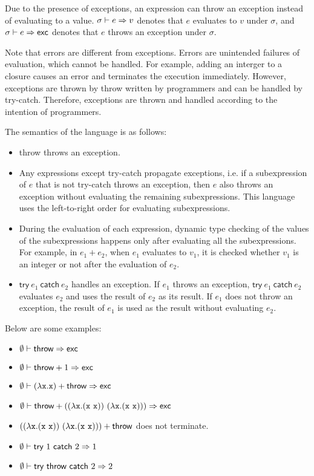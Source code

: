 \begin{enumerate}
Due to the presence of exceptions, an expression can throw an exception
instead of evaluating to a value. $\sigma\vdash e\Rightarrow v$ denotes that $e$
evaluates to $v$ under $\sigma$, and $\sigma\vdash e\Rightarrow\textsf{exc}$ denotes that $e$
throws an exception under $\sigma$.

Note that errors are
different from exceptions. Errors are unintended failures of evaluation, which
cannot be handled. For example, adding an interger to a closure causes an error
and terminates the execution immediately.
However, exceptions are thrown by \textsf{throw} written by programmers and
can be handled by \textsf{try-catch}. Therefore, exceptions are thrown and handled
according to the intention of programmers.

The semantics of the language is as follows:

\begin{itemize}
  \item \textsf{throw} throws an exception.
  \item Any expressions except \textsf{try-catch} propagate exceptions, i.e. if a
    subexpression of $e$ that is not \textsf{try-catch} throws an exception, then
    $e$ also throws an exception without evaluating the remaining subexpressions.
    This language uses the left-to-right order for evaluating subexpressions.
  \item During the evaluation of each expression,
    dynamic type checking of the values of the subexpressions happens only after
    evaluating all the subexpressions. For example, in $e_1+e_2$, when $e_1$
    evaluates to $v_1$, it is checked whether $v_1$ is an integer or not after
    the evaluation of $e_2$.
  \item $\textsf{try}\ e_1\ \textsf{catch}\ e_2$ handles an exception. If $e_1$ throws
    an exception, $\textsf{try}\ e_1\ \textsf{catch}\ e_2$ evaluates $e_2$ and uses the
    result of $e_2$ as its result. If $e_1$ does not throw an exception, the
    result of $e_1$ is used as the result without evaluating $e_2$.
\end{itemize}

Below are some examples:

\begin{itemize}
  \item $\emptyset\vdash\textsf{throw}\Rightarrow\textsf{exc}$
  \item $\emptyset\vdash\textsf{throw}+1\Rightarrow\textsf{exc}$
  \item $\emptyset\vdash(\lambda\texttt{x}.\texttt{x})+\textsf{throw}\Rightarrow\textsf{exc}$
  \item $\emptyset\vdash\textsf{throw}+((\lambda\texttt{x}.(\texttt{x}\ \texttt{x}))\ (\lambda\texttt{x}.(\texttt{x}\ \texttt{x})))\Rightarrow\textsf{exc}$
  \item $((\lambda\texttt{x}.(\texttt{x}\ \texttt{x}))\ (\lambda\texttt{x}.(\texttt{x}\ \texttt{x})))+\textsf{throw}$ does not terminate.
  \item $\evale{\textsf{try}\ 1\ \textsf{catch}\ 2}{1}$
  \item $\evale{\textsf{try}\ \textsf{throw}\ \textsf{catch}\ 2}{2}$
\end{itemize}


\end{enumerate}
